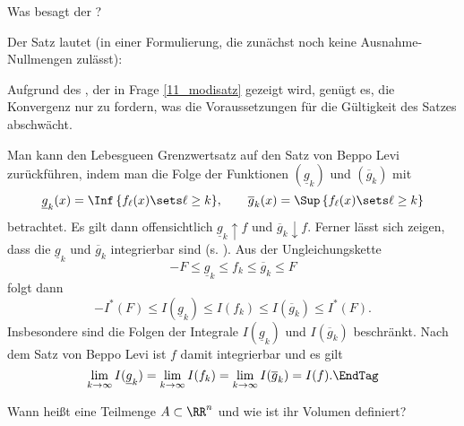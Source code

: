 \begin{frage}
  Was besagt der ?
\end{frage}

\begin{antwort}
  Der Satz lautet (in einer Formulierung, die zunächst noch keine 
  Ausnahme-Nullmengen zulässt):

  \medskip
  \noindent{}
  \noindent{} 
  Aufgrund des , der in Frage 
  \ref{11_modisatz} gezeigt wird, genügt es, 
  die Konvergenz nur  zu fordern, was die Voraussetzungen 
  für die Gültigkeit des Satzes abschwächt. 

  \medskip\noindent
  Man kann den Lebesgue\sch en Grenzwertsatz auf den Satz von Beppo Levi 
  zurückführen, indem man die Folge der Funktionen 
  $(\underline{g}_k)$ und $(\overline{g}_k)$ mit 
  \[
  \underline{g}_k ( x ) = \Inf \,\{ f_\ell (x) \sets \ell\ge k \}, \qquad
  \overline{g}_k ( x ) = \Sup \,\{ f_\ell (x) \sets \ell\ge k \}
  \]
  betrachtet. Es gilt dann offensichtlich 
  $\underline{g}_k \uparrow f$ 
  und $\overline{g}_k \downarrow f$. Ferner lässt sich zeigen, dass die 
  $\underline{g}_k$ und $\overline{g}_k$ integrierbar sind 
  (s. \citep{Forster}). Aus der Ungleichungskette 
  \[
  - F \le \underline{g}_k \le f_k \le \overline{g}_k \le F 
  \]
  folgt dann 
  \[
  - I^*(F) \le I (\underline{g}_k) \le I(f_k) \le I(\overline{g}_k) \le I^*(F). 
  \]
  Insbesondere sind die Folgen der Integrale $I (\underline{g}_k)$ und 
  $I (\overline{g}_k)$ beschränkt. Nach dem Satz von Beppo Levi 
  ist $f$ damit integrierbar und es gilt 
  \[
  \lim_{k\to\infty} I (\underline{g}_k) = 
  \lim_{k\to\infty} I (f_k) = 
  \lim_{k\to\infty} I (\overline{g}_k) = 
  I(f). \EndTag
  \]
\end{antwort} 

\begin{frage}
  Wann hei{\ss}t eine Teilmenge $A\subset\RR^n$ 
   und wie ist ihr Volumen definiert?
\end{frage}

